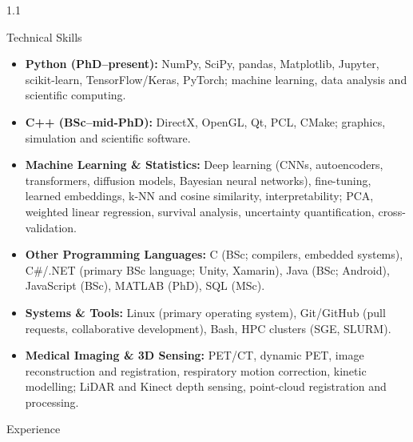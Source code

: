 \documentclass{cv}
\begin{document}
\begin{spacing}{1.1}
        \begin{rSection}{Technical Skills}
            \begin{itemize}
                \item \textbf{Python (PhD--present):} NumPy, SciPy, pandas, Matplotlib, Jupyter, scikit-learn, TensorFlow/Keras, PyTorch; machine learning, data analysis and scientific computing.
                \item \textbf{C++ (BSc--mid-PhD):} DirectX, OpenGL, Qt, PCL, CMake; graphics, simulation and scientific software.
                \item \textbf{Machine Learning \& Statistics:} Deep learning (CNNs, autoencoders, transformers, diffusion models, Bayesian neural networks), fine-tuning, learned embeddings, k-NN and cosine similarity, interpretability; PCA, weighted linear regression, survival analysis, uncertainty quantification, cross-validation.
                \item \textbf{Other Programming Languages:} C (BSc; compilers, embedded systems), C\#/.NET (primary BSc language; Unity, Xamarin), Java (BSc; Android), JavaScript (BSc), MATLAB (PhD), SQL (MSc).
                \item \textbf{Systems \& Tools:} Linux (primary operating system), Git/GitHub (pull requests, collaborative development), Bash, HPC clusters (SGE, SLURM).
                \item \textbf{Medical Imaging \& 3D Sensing:} PET/CT, dynamic PET, image reconstruction and registration, respiratory motion correction, kinetic modelling; LiDAR and Kinect depth sensing, point-cloud registration and processing.
            \end{itemize}
        \end{rSection}
        
        \begin{rSection}{Experience}
            \vspace{-0.35cm}
            

\end{rSection}
\end{spacing}
\end{document}
